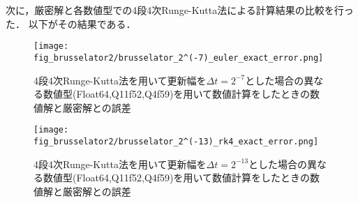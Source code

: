 次に，厳密解と各数値型での4段4次Runge-Kutta法による計算結果の比較を行った．
以下がその結果である．\\
\begin{figure}[H]
    \centering
    \begin{minipage}[b]{0.49\columnwidth}
        \centering
        \texttt{[image: fig\_brusselator2/brusselator\_2^(-7)\_euler\_exact\_error.png]}
        \caption{4段4次Runge-Kutta法を用いて更新幅を$\Delta t = 2^{-7}$とした場合の異なる数値型(Float64,Q11f52,Q4f59)を用いて数値計算をしたときの数値解と厳密解との誤差}
        \label{fig:brusselator_2^(-7)_rk4_exact_error}
    \end{minipage}
    \begin{minipage}[b]{0.49\columnwidth}
        \centering
        \texttt{[image: fig\_brusselator2/brusselator\_2^(-13)\_rk4\_exact\_error.png]}
        \caption{4段4次Runge-Kutta法を用いて更新幅を$\Delta t =  2^{-13}$とした場合の異なる数値型(Float64,Q11f52,Q4f59)を用いて数値計算をしたときの数値解と厳密解との誤差}
        \label{fig:brusselator_2^(-13)_rk4_exact_error}
    \end{minipage}
\end{figure}

